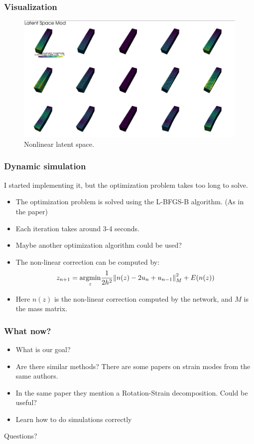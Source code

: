 \documentclass{beamer}
\DeclareMathOperator{\argmin}{argmin}
\begin{document}
\begin{frame}
    \frametitle{Visualization}
    \begin{figure}
        \centering
        \includegraphics[scale=0.15]{Images/image.png}
        \caption{Nonlinear latent space.}
    \end{figure}
\end{frame}

\begin{frame}
    \frametitle{Dynamic simulation}
    I started implementing it, but the optimization problem takes too long to solve.
    \begin{itemize}
        \item The optimization problem is solved using the L-BFGS-B algorithm. (As in the paper)
        \item Each iteration takes around 3-4 seconds.
        \item Maybe another optimization algorithm could be used?
    \end{itemize}
    \begin{itemize}
        \item The non-linear correction can be computed by:
        \[
        z_{n+1} = \underset{z}{\argmin}  \frac{1}{2h^2} \norm{n(z) - 2u_n + u_{n-1}}^2_M + E(n(z))
        \]
        \item Here \(n(z)\) is the non-linear correction computed by the network, and \(M\) is the mass matrix.
    \end{itemize}
\end{frame}

\begin{frame}
    \frametitle{What now?}
    \begin{itemize}
        \item What is our goal?
        \item Are there similar methods? There are some papers on strain modes from the same authors.
        \item In the same paper they mention a Rotation-Strain decomposition. Could be useful?
        \item Learn how to do simulations correctly
    
    \end{itemize}
\end{frame}

\begin{frame}
    \begin{center}
        \color{blue} \Huge{Questions?}
    \end{center}

\end{frame}
\end{document}
